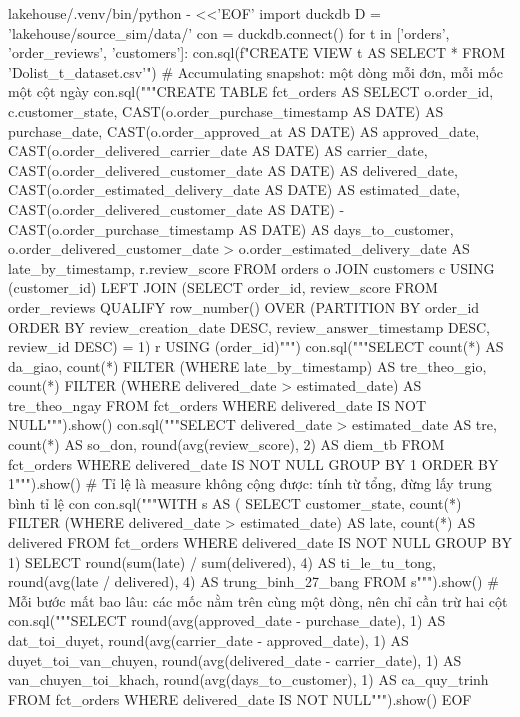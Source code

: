\begin{codeblock}
lakehouse/.venv/bin/python - <<'EOF'
import duckdb
D = 'lakehouse/source_sim/data/'
con = duckdb.connect()
for t in ['orders', 'order_reviews', 'customers']:
    con.sql(f"CREATE VIEW {t} AS SELECT * FROM '{D}olist_{t}_dataset.csv'")
# Accumulating snapshot: một dòng mỗi đơn, mỗi mốc một cột ngày
con.sql("""CREATE TABLE fct_orders AS
  SELECT o.order_id, c.customer_state,
         CAST(o.order_purchase_timestamp AS DATE)      AS purchase_date,
         CAST(o.order_approved_at AS DATE)             AS approved_date,
         CAST(o.order_delivered_carrier_date AS DATE)  AS carrier_date,
         CAST(o.order_delivered_customer_date AS DATE) AS delivered_date,
         CAST(o.order_estimated_delivery_date AS DATE) AS estimated_date,
         CAST(o.order_delivered_customer_date AS DATE)
           - CAST(o.order_purchase_timestamp AS DATE)  AS days_to_customer,
         o.order_delivered_customer_date > o.order_estimated_delivery_date
           AS late_by_timestamp,
         r.review_score
  FROM orders o JOIN customers c USING (customer_id)
  LEFT JOIN (SELECT order_id, review_score FROM order_reviews
             QUALIFY row_number() OVER (PARTITION BY order_id
               ORDER BY review_creation_date DESC, review_answer_timestamp DESC,
                        review_id DESC) = 1) r USING (order_id)""")
con.sql("""SELECT count(*) AS da_giao,
                  count(*) FILTER (WHERE late_by_timestamp) AS tre_theo_gio,
                  count(*) FILTER (WHERE delivered_date > estimated_date)
                    AS tre_theo_ngay
           FROM fct_orders WHERE delivered_date IS NOT NULL""").show()
con.sql("""SELECT delivered_date > estimated_date AS tre, count(*) AS so_don,
                  round(avg(review_score), 2) AS diem_tb
           FROM fct_orders WHERE delivered_date IS NOT NULL
           GROUP BY 1 ORDER BY 1""").show()
# Tỉ lệ là measure không cộng được: tính từ tổng, đừng lấy trung bình tỉ lệ con
con.sql("""WITH s AS (
             SELECT customer_state,
                    count(*) FILTER (WHERE delivered_date > estimated_date) AS late,
                    count(*) AS delivered
             FROM fct_orders WHERE delivered_date IS NOT NULL GROUP BY 1)
           SELECT round(sum(late) / sum(delivered), 4) AS ti_le_tu_tong,
                  round(avg(late / delivered), 4)      AS trung_binh_27_bang
           FROM s""").show()
# Mỗi bước mất bao lâu: các mốc nằm trên cùng một dòng, nên chỉ cần trừ hai cột
con.sql("""SELECT
             round(avg(approved_date - purchase_date), 1) AS dat_toi_duyet,
             round(avg(carrier_date - approved_date), 1)  AS duyet_toi_van_chuyen,
             round(avg(delivered_date - carrier_date), 1) AS van_chuyen_toi_khach,
             round(avg(days_to_customer), 1)              AS ca_quy_trinh
           FROM fct_orders WHERE delivered_date IS NOT NULL""").show()
EOF
\end{codeblock}
